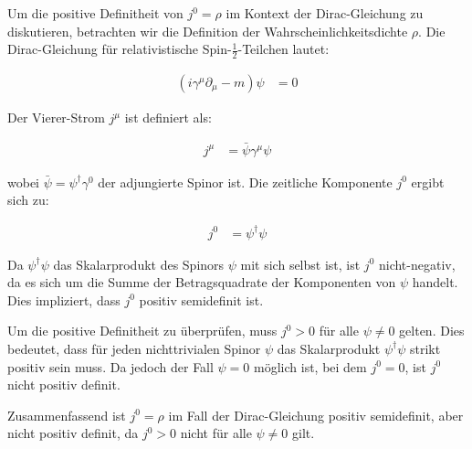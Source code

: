 Um die positive Definitheit von $j^0 = \rho$ im Kontext der Dirac-Gleichung zu diskutieren, betrachten wir die Definition der Wahrscheinlichkeitsdichte $\rho$. Die Dirac-Gleichung für relativistische Spin-$\frac{1}{2}$-Teilchen lautet:

\begin{align*}
(i\gamma^\mu \partial_\mu - m)\psi &= 0
\end{align*}

Der Vierer-Strom $j^\mu$ ist definiert als:

\begin{align*}
j^\mu &= \bar{\psi} \gamma^\mu \psi
\end{align*}

wobei $\bar{\psi} = \psi^\dagger \gamma^0$ der adjungierte Spinor ist. Die zeitliche Komponente $j^0$ ergibt sich zu:

\begin{align*}
j^0 &= \psi^\dagger \psi
\end{align*}

Da $\psi^\dagger \psi$ das Skalarprodukt des Spinors $\psi$ mit sich selbst ist, ist $j^0$ nicht-negativ, da es sich um die Summe der Betragsquadrate der Komponenten von $\psi$ handelt. Dies impliziert, dass $j^0$ positiv semidefinit ist.

Um die positive Definitheit zu überprüfen, muss $j^0 > 0$ für alle $\psi \neq 0$ gelten. Dies bedeutet, dass für jeden nichttrivialen Spinor $\psi$ das Skalarprodukt $\psi^\dagger \psi$ strikt positiv sein muss. Da jedoch der Fall $\psi = 0$ möglich ist, bei dem $j^0 = 0$, ist $j^0$ nicht positiv definit.

Zusammenfassend ist $j^0 = \rho$ im Fall der Dirac-Gleichung positiv semidefinit, aber nicht positiv definit, da $j^0 > 0$ nicht für alle $\psi \neq 0$ gilt.

